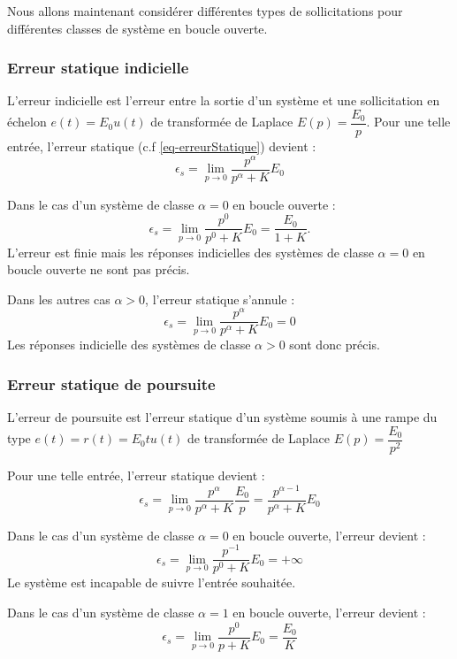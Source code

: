 Nous allons maintenant considérer différentes types de sollicitations pour différentes
classes de système en boucle ouverte.

\subsubsection{Erreur statique indicielle}

L'erreur indicielle est l'erreur entre la sortie d'un système et une 
sollicitation en échelon $e(t)=E_0u(t)$ de transformée de Laplace 
$E(p)=\dfrac{E_0}{p}$. 
Pour une telle entrée, l'erreur statique (c.f \cref{eq-erreurStatique}) devient :
$$
\epsilon_s=\lim\limits_{p\to 0} \dfrac{p^\alpha}{p^\alpha+K}E_0
$$

Dans le cas d'un système de classe $\alpha=0$ en boucle ouverte :
$$
\epsilon_s=\lim\limits_{p\to 0} \dfrac{p^0}{p^0+K}E_0=\dfrac{E_0}{1+K}.
$$
L'erreur est finie mais les réponses indicielles des systèmes de classe 
$\alpha=0$ en boucle ouverte ne sont pas précis.

Dans les autres cas $\alpha>0$, l'erreur statique s'annule :
$$
\epsilon_s=\lim\limits_{p\to 0} \dfrac{p^\alpha}{p^\alpha+K}E_0=0
$$
Les réponses indicielle des systèmes de classe $\alpha>0$ sont donc précis.

\subsubsection{Erreur statique de poursuite}
L'erreur de poursuite est l'erreur statique d'un système soumis à une rampe 
du type $e(t)=r(t)=E_0t u(t)$
de transformée de Laplace $E(p)=\dfrac{E_0}{p^2}$

Pour une telle entrée, l'erreur statique devient :
$$
\epsilon_s=\lim\limits_{p\to 0} \dfrac{p^\alpha}{p^\alpha+K}\dfrac{E_0}{p}=\dfrac{p^{\alpha-1}}{p^\alpha+K}E_0 
$$

Dans le cas d'un système de classe $\alpha=0$ en boucle ouverte, l'erreur devient :
$$
\epsilon_s=\lim\limits_{p\to 0}\dfrac{p^{-1}}{p^0+K}E_0=+\infty
$$
Le système est incapable de suivre l'entrée souhaitée.

Dans le cas d'un système de classe $\alpha=1$ en boucle ouverte, l'erreur devient :
$$
\epsilon_s=\lim\limits_{p\to 0}\dfrac{p^0}{p+K}E_0=\dfrac{E_0}{K}
$$

